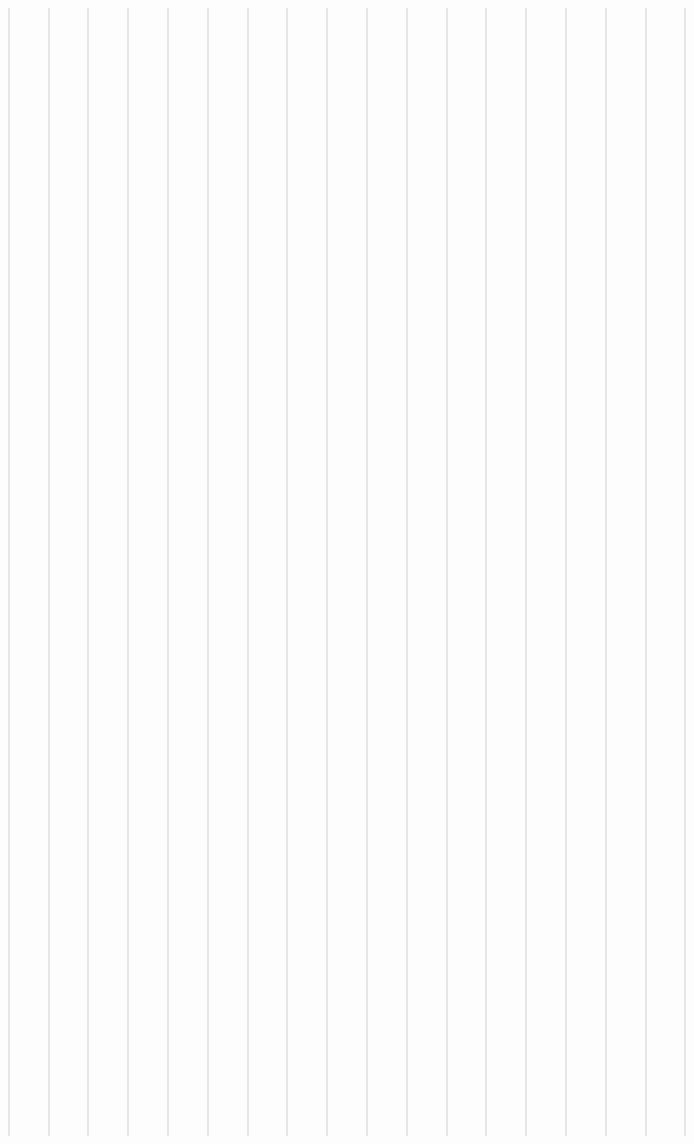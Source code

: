 \documentclass[letterpaper,10pt,english]{sphinxmanual}
\begin{document}
\begin{quote}
\begin{quote}
\begin{quote}
\begin{quote}
\begin{quote}
\begin{quote}
\begin{quote}
\begin{quote}
\begin{quote}
\begin{quote}
\begin{quote}
\begin{quote}
\begin{quote}
\begin{quote}
\begin{quote}
\begin{quote}
\begin{quote}
\begin{quote}
\begin{quote}
\begin{quote}
\begin{quote}
\begin{quote}
\begin{quote}
\begin{quote}
\begin{quote}
\begin{quote}
\begin{quote}
\begin{quote}
\begin{quote}
\begin{quote}
\begin{quote}
\begin{quote}
\begin{quote}
\begin{quote}
\begin{quote}
\begin{quote}
\begin{quote}
\begin{quote}
\begin{quote}
\begin{quote}
\begin{quote}
\begin{quote}
\begin{quote}
\begin{quote}
\begin{quote}
\begin{quote}
\begin{quote}
\begin{quote}
\begin{quote}
\begin{quote}
\begin{quote}
\begin{quote}
\begin{quote}
\begin{quote}
\begin{quote}
\begin{quote}
\begin{quote}
\begin{quote}
\begin{quote}
\begin{quote}
\begin{quote}
\begin{quote}
\begin{quote}
\begin{quote}
\begin{quote}
\begin{quote}
\begin{quote}
\begin{quote}
\begin{quote}
\begin{quote}
\begin{quote}
\begin{quote}
\begin{quote}
\begin{quote}
\begin{quote}
\begin{quote}
\begin{quote}
\begin{quote}
\begin{quote}
\begin{quote}
\begin{quote}
\begin{quote}
\begin{quote}
\begin{quote}
\begin{quote}
\begin{quote}
\begin{quote}
\begin{quote}
\begin{quote}
\begin{quote}
\begin{quote}
\begin{quote}
\begin{quote}
\begin{savenotes}
\begin{longtable}[c]{|||}
\begin{savenotes}
\begin{longtable}[c]{|||||||}
\begin{savenotes}
\begin{longtable}[c]{|||}
\begin{sphinxShadowBox}
\begin{itemize}
phinxAtStartPar
\label{\detokenize{data:id2}}{\hyperref[\detokenize{data:data}]{}}
\begin{itemize}
\item {} 
\sphinxAtStartPar
{}\label{\detokenize{data:id3}}{\hyperref[\detokenize{data:current-data}]{}}

\item {} 
\sphinxAtStartPar
{}\label{\detokenize{data:id4}}{\hyperref[\detokenize{data:archived-data}]{}}
\begin{itemize}
\item {} 
\sphinxAtStartPar
{}\label{\detokenize{data:id5}}{\hyperref[\detokenize{data:id1}]{}}

\end{itemize}

\end{itemize}

\end{itemize}
\end{sphinxShadowBox}


\section{Current Data}
\label{\detokenize{data:current-data}}\begin{quote}\begin{description}
<<<<<<< HEAD
\item[{Excel Download Link:}] \leavevmode
\sphinxAtStartPar
\sphinxurl{https://github.com/justin-napolitano/turkish-kurdish-conflict/blob/2480c62b4e7e947adb346e938e2853
\end{description}
\end{quote}
\end{longtable}
\end{savenotes}
\end{longtable}
\end{savenotes}
\end{longtable}
\end{savenotes}
\end{quote}
\end{quote}
\end{quote}
\end{quote}
\end{quote}
\end{quote}
\end{quote}
\end{quote}
\end{quote}
\end{quote}
\end{quote}
\end{quote}
\end{quote}
\end{quote}
\end{quote}
\end{quote}
\end{quote}
\end{quote}
\end{quote}
\end{quote}
\end{quote}
\end{quote}
\end{quote}
\end{quote}
\end{quote}
\end{quote}
\end{quote}
\end{quote}
\end{quote}
\end{quote}
\end{quote}
\end{quote}
\end{quote}
\end{quote}
\end{quote}
\end{quote}
\end{quote}
\end{quote}
\end{quote}
\end{quote}
\end{quote}
\end{quote}
\end{quote}
\end{quote}
\end{quote}
\end{quote}
\end{quote}
\end{quote}
\end{quote}
\end{quote}
\end{quote}
\end{quote}
\end{quote}
\end{quote}
\end{quote}
\end{quote}
\end{quote}
\end{quote}
\end{quote}
\end{quote}
\end{quote}
\end{quote}
\end{quote}
\end{quote}
\end{quote}
\end{quote}
\end{quote}
\end{quote}
\end{quote}
\end{quote}
\end{quote}
\end{quote}
\end{quote}
\end{quote}
\end{quote}
\end{quote}
\end{quote}
\end{quote}
\end{quote}
\end{quote}
\end{quote}
\end{quote}
\end{quote}
\end{quote}
\end{quote}
\end{quote}
\end{quote}
\end{quote}
\end{quote}
\end{quote}
\end{quote}
\end{quote}
\end{quote}
\end{document}
